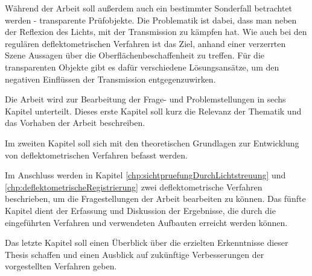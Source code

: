 \p
Während der Arbeit soll außerdem auch ein bestimmter Sonderfall betrachtet werden - transparente Prüfobjekte.
Die Problematik ist dabei, dass man neben der Reflexion des Lichts, mit der Transmission zu kämpfen hat.
Wie auch bei den regulären deflektometrischen Verfahren ist das Ziel, anhand einer verzerrten Szene Aussagen über die Oberflächenbeschaffenheit zu treffen.
Für die transparenten Objekte gibt es dafür verschiedene Lösungsansätze, um den negativen Einflüssen der Transmission entgegenzuwirken.

\p
Die Arbeit wird zur Bearbeitung der Frage- und Problemstellungen in sechs Kapitel unterteilt. 
Dieses erste Kapitel soll kurz die Relevanz der Thematik und das Vorhaben der Arbeit beschreiben.

\p
Im zweiten Kapitel soll sich mit den theoretischen Grundlagen zur Entwicklung von deflektometrischen Verfahren befasst werden.

\p
Im Anschluss werden in Kapitel \ref{chp:sichtpruefungDurchLichtstreuung} und \ref{chp:deflektometrischeRegistrierung} zwei deflektometrische Verfahren beschrieben, um die Fragestellungen der Arbeit bearbeiten zu können.
\p
Das fünfte Kapitel dient der Erfassung und Diskussion der Ergebnisse, die durch die eingeführten Verfahren und verwendeten Aufbauten erreicht werden können.

\p
Das letzte Kapitel soll einen Überblick über die erzielten Erkenntnisse dieser Thesis schaffen und einen Ausblick auf zukünftige Verbesserungen der vorgestellten Verfahren geben.